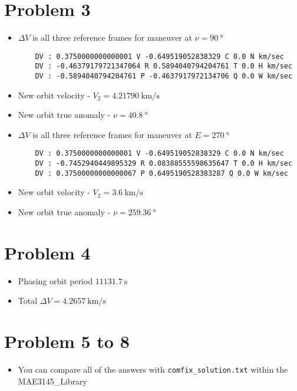 \documentclass[10pt]{article}
\theoremstyle{definition}
\begin{document}
\section*{Problem 3}
\begin{itemize}
    \item \( \Delta V \) is all three reference frames for maneuver at \( \nu = \SI{90}{\degree}\)
        \begin{verbatim}
    DV : 0.3750000000000001 V -0.649519052838329 C 0.0 N km/sec
    DV : -0.46379179721347064 R 0.5894040794204761 T 0.0 H km/sec
    DV : -0.5894040794204761 P -0.4637917972134706 Q 0.0 W km/sec
        \end{verbatim}
    \item New orbit velocity - \( V_2 = \SI{4.21790}{\kilo\meter\per\second}\)
    \item New orbit true anomaly - \( \nu = \SI{40.8}{\degree}\)
    \item \( \Delta V \) is all three reference frames for maneuver at \( E = \SI{270}{\degree}\)
        \begin{verbatim}
    DV : 0.3750000000000001 V -0.649519052838329 C 0.0 N km/sec
    DV : -0.7452940449895329 R 0.08388555598635647 T 0.0 H km/sec
    DV : 0.37500000000000067 P 0.6495190528383287 Q 0.0 W km/sec
        \end{verbatim}
    \item New orbit velocity - \( V_2 = \SI{3.6}{\kilo\meter\per\second}\)
    \item New orbit true anomaly - \( \nu = \SI{259.36}{\degree}\)
\end{itemize}

\section*{Problem 4}
\begin{itemize}
    \item Phasing orbit period \( \SI{11131.7}{\second}\)
    \item Total \( \Delta V = \SI{4.2657}{\kilo\meter\per\second}\) 
\end{itemize}

\section*{Problem 5 to 8}
\begin{itemize}
    \item You can compare all of the answers with \texttt{comfix\_solution.txt} within the MAE3145\_Library
\end{itemize}
\end{document}
